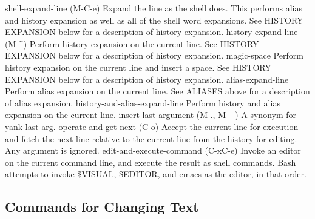 shell-expand-line (M-C-e)
Expand the line as the shell does. This performs alias and history expansion as well as all of the shell word expansions. See HISTORY EXPANSION below for a description of history expansion.
history-expand-line (M-\^{})
Perform history expansion on the current line. See HISTORY EXPANSION below for a description of history expansion.
magic-space
Perform history expansion on the current line and insert a space. See HISTORY EXPANSION below for a description of history expansion.
alias-expand-line
Perform alias expansion on the current line. See ALIASES above for a description of alias expansion.
history-and-alias-expand-line
Perform history and alias expansion on the current line.
insert-last-argument (M-., M-\_)
A synonym for yank-last-arg.
operate-and-get-next (C-o)
Accept the current line for execution and fetch the next line relative to the current line from the history for editing. Any argument is ignored.
edit-and-execute-command (C-xC-e)
Invoke an editor on the current command line, and execute the result as shell commands. Bash attempts to invoke \$VISUAL, \$EDITOR, and emacs as the editor, in that order.
\subsection{Commands for Changing Text}\label{sec:commandsforchangingtext}

